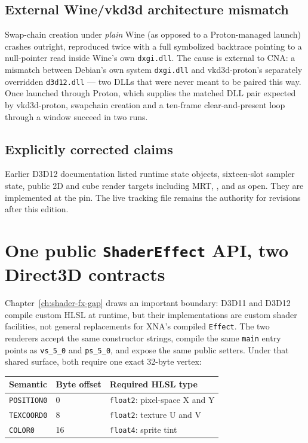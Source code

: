 \subsection{External Wine/vkd3d architecture mismatch}

Swap-chain creation under \emph{plain} Wine (as opposed to a Proton-managed launch) crashes
outright, reproduced twice with a full symbolized backtrace pointing to a null-pointer read
inside Wine's own \texttt{dxgi.dll}. The cause is external to
CNA: a mismatch between Debian's own system \texttt{dxgi.dll} and vkd3d-proton's separately
overridden \texttt{d3d12.dll} --- two DLLs that were never meant to be paired this way. Once
launched through Proton, which supplies the matched DLL pair expected by vkd3d-proton,
swapchain creation and a ten-frame clear-and-present loop through a window succeed in two runs.

\subsection{Explicitly corrected claims}

Earlier D3D12 documentation listed runtime state objects, sixteen-slot sampler state, public 2D
and cube render targets including MRT, , and
 as open. They are implemented at the pin. The live tracking
file remains the authority for revisions after this edition.

\section{One public \texttt{ShaderEffect} API, two Direct3D contracts}

Chapter~\ref{ch:shader-fx-gap} draws an important boundary: D3D11 and D3D12
compile custom HLSL at runtime, but their implementations are  custom
shader facilities, not general replacements for XNA's compiled \texttt{Effect}. The two
renderers accept the same constructor strings, compile the same \texttt{main} entry points as
\texttt{vs\_5\_0} and \texttt{ps\_5\_0}, and expose the same public setters. Under that shared
surface, both require one exact 32-byte vertex:

\begin{longtable}{@{}p{}p{}p{}@{}}
\toprule
\textbf{Semantic} & \textbf{Byte offset} & \textbf{Required HLSL type} \\
\midrule
\endhead
\texttt{POSITION0} & 0  & \texttt{float2}: pixel-space X and Y \\
\texttt{TEXCOORD0} & 8  & \texttt{float2}: texture U and V \\
\texttt{COLOR0}    & 16 & \texttt{float4}: sprite tint \\
\bottomrule
\end{longtable}

